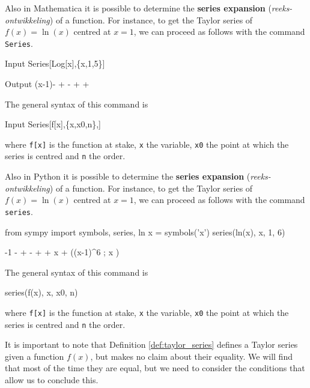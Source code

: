 \ifmathematica
Also in Mathematica it is possible to determine the \textbf{series expansion} (\textit{reeks-ontwikkeling}) of a function. For instance, to get the Taylor series of $f(x) = \ln(x)$ centred at $x=1$, we can proceed as follows with the command \lstinline{Series}. 
	\begin{mdframed}[default,backgroundcolor=gray!40,roundcorner=8pt]
\begin{mmaCell}[morefunctionlocal={x}]{Input}
  Series[Log[x],\{x,1,5\}]
\end{mmaCell}

\begin{mmaCell}{Output}
  (x-1)- + - + +
\end{mmaCell}
\end{mdframed}
The general syntax of this command is 
\begin{mmaCell}[morefunctionlocal={x}]{Input}
  Series[f[x],\{x,x0,n\},]
\end{mmaCell}
where \lstinline{f[x]} is the function at stake, \lstinline{x} the variable, \lstinline{x0} the point at which the series is centred and \lstinline{n} the order. 
\fi

\ifpython
Also in Python it is possible to determine the \textbf{series expansion} (\textit{reeks-ontwikkeling}) of a function. For instance, to get the Taylor series of $f(x) = \ln(x)$ centred at $x=1$, we can proceed as follows with the command \lstinline{series}.
\begin{pyin}
from sympy import symbols, series, ln
x = symbols('x')
series(ln(x), x, 1, 6)
\end{pyin}
\begin{pyout}
-1 -  +  -  +  + x + ((x-1)^6 ; x )
\end{pyout}
The general syntax of this command is 
\begin{pyin}
series(f(x), x, x0, n)
\end{pyin}
where \lstinline{f[x]} is the function at stake, \lstinline{x} the variable, \lstinline{x0} the point at which the series is centred and \lstinline{n} the order. 
\fi

It is important to note that Definition \ref{def:taylor_series} defines a Taylor series given a function $f(x)$, but makes no claim about their equality.  We will find that most of the time they are equal, but we need to consider the conditions that allow us to conclude this.

